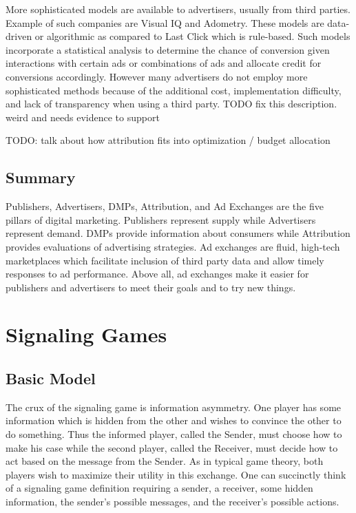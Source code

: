 \documentclass{article}
\begin{document}
More sophisticated models are available to advertisers, usually from third parties. Example of such companies are Visual IQ and Adometry. These models are data-driven or algorithmic as compared to Last Click which is rule-based. Such models incorporate a statistical analysis to determine the chance of conversion given interactions with certain ads or combinations of ads and allocate credit for conversions accordingly. However many advertisers do not employ more sophisticated methods because of the additional cost, implementation difficulty, and lack of transparency when using a third party. TODO fix this description. weird and needs evidence to support

TODO: talk about how attribution fits into optimization / budget allocation

\subsection{Summary}

Publishers, Advertisers, DMPs, Attribution, and Ad Exchanges are the five pillars of digital marketing. Publishers represent supply while Advertisers represent demand. DMPs provide information about consumers while Attribution provides evaluations of advertising strategies. Ad exchanges are fluid, high-tech marketplaces which facilitate inclusion of third party data and allow timely responses to ad performance. Above all, ad exchanges make it easier for publishers and advertisers to meet their goals and to try new things. 

\newpage

\section{Signaling Games}

\subsection{Basic Model}

The crux of the signaling game is information asymmetry. One player has some information which is hidden from the other and wishes to convince the other to do something. Thus the informed player, called the Sender, must choose how to make his case while the second player, called the Receiver, must decide how to act based on the message from the Sender. As in typical game theory, both players wish to maximize their utility in this exchange. One can succinctly think of a signaling game definition requiring a sender, a receiver, some hidden information, the sender's possible messages, and the receiver's possible actions.
\end{document}
